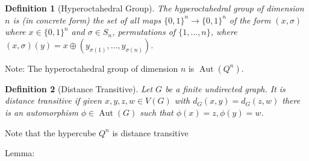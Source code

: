 \documentclass{article}
\newtheorem{definition}{Definition}
\DeclareMathOperator{\Aut}{Aut}
\begin{document}
\begin{definition}[Hyperoctahedral Group]
The \emph{hyperoctahedral group} of dimension $n$ is (in concrete
form) the set of all maps $\{0,1\}^n \rightarrow \{0,1\}^n$ of the
form $(x,\sigma)$ where $x \in \{0,1\}^n$ and $\sigma \in S_n$,
permutations of $\{1, \dots, n\}$, where $(x, \sigma) (y) = x \oplus
(y_{\sigma(1)}, \dots, y_{\sigma(n)})$.
  
\end{definition}
Note: The hyperoctahedral group of dimension $n$ is $\Aut(Q^n)$.

\begin{definition}[Distance Transitive]
Let $G$ be a finite undirected graph.  It is \emph{distance
  transitive} if given $x,y,z,w \in V(G)$ with $d_G(x,y) = d_G(z,w)$
there is an automorphism $\phi \in \Aut(G)$ such that $\phi(x) = z, \phi(y) = w$.
  
\end{definition}
Note that the hypercube $Q^n$ is distance transitive

Lemma: 


\end{document}
